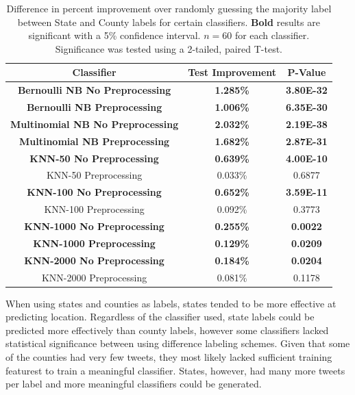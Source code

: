 \documentclass[midd]{thesis}
\begin{document}
\begin{table}
\label{fig:labelingResults}
\caption{Difference in percent improvement over randomly guessing the majority label between State and County labels for certain classifiers. \textbf{Bold} results are significant with a 5\% confidence interval. $n=60$ for each classifier. Significance was tested using a 2-tailed, paired T-test.\newline }

\centering 
  \begin{tabular}{| c | c | c |}
  \hline      
  Classifier & Test Improvement & P-Value \\
  \hline
\textbf{Bernoulli NB No Preprocessing} &\textbf{ 1.285\% }& \textbf{ 3.80E-32 }\\
\textbf{Bernoulli NB Preprocessing} &\textbf{ 1.006\% }& \textbf{ 6.35E-30 }\\
\textbf{Multinomial NB No Preprocessing} &\textbf{ 2.032\% }& \textbf{ 2.19E-38 }\\
\textbf{Multinomial NB Preprocessing} &\textbf{ 1.682\% }& \textbf{ 2.87E-31 }\\
\textbf{KNN-50 No Preprocessing}&\textbf{ 0.639\% }& \textbf{ 4.00E-10 }\\
KNN-50 Preprocessing & 0.033\% & 0.6877 \\
\textbf{KNN-100 No Preprocessing} &\textbf{ 0.652\% }& \textbf{ 3.59E-11 }\\
KNN-100 Preprocessing & 0.092\% & 0.3773 \\
\textbf{KNN-1000 No Preprocessing} &\textbf{ 0.255\% }& \textbf{ 0.0022 }\\
\textbf{KNN-1000 Preprocessing} &\textbf{ 0.129\% }& \textbf{ 0.0209 }\\
\textbf{KNN-2000 No Preprocessing} &\textbf{ 0.184\% }& \textbf{ 0.0204 }\\
KNN-2000 Preprocessing & 0.081\% & 0.1178 \\
  \hline  
  \end{tabular}
\end{table}



When using states and counties as labels, states tended to be more effective at predicting location. Regardless of the classifier used, state labels could be predicted more effectively than county labels, however some classifiers lacked statistical significance between using difference labeling schemes. Given that some of the counties had very few tweets, they most likely lacked sufficient training featurest to train a meaningful classifier. States, however, had many more tweets per label and more meaningful classifiers could be generated.
\end{document}
